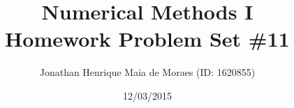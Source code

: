 \title{Numerical Methods I \\ Homework Problem Set \#11}
\author{Jonathan Henrique Maia de Moraes (ID: 1620855)}
\date{12/03/2015}
\maketitle
